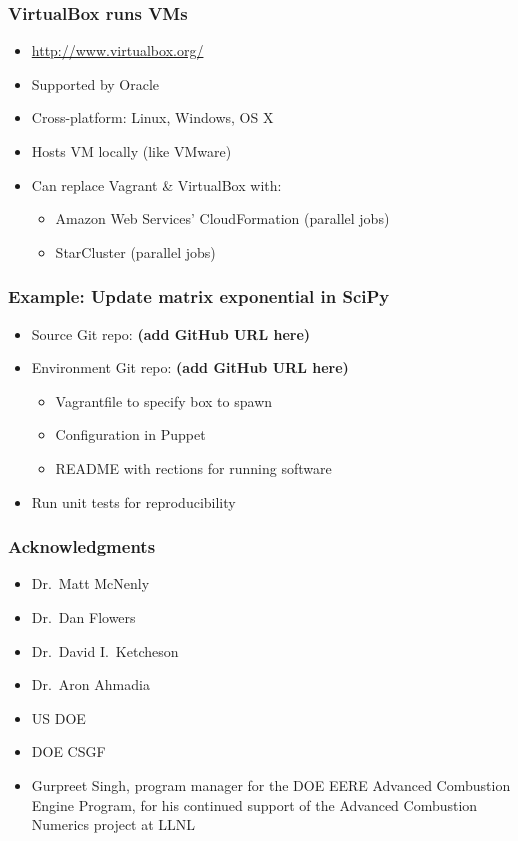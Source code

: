 \documentclass [14pt]{beamer}
\begin{document}
\begin{frame}
\frametitle{VirtualBox runs VMs}
\begin{itemize}
\item \url{http://www.virtualbox.org/}
\item Supported by Oracle
\item Cross-platform: Linux, Windows, OS X
\item Hosts VM locally (like VMware)
\item Can replace Vagrant \& VirtualBox with:
\begin{itemize}
\item Amazon Web Services' CloudFormation (parallel jobs)
\item StarCluster (parallel jobs)
\end{itemize}
\end{itemize}
\end{frame}

\begin{frame}
\frametitle{Example: Update matrix exponential in SciPy}
\begin{itemize}
\item Source Git repo: \textbf{(add GitHub URL here)}
\item Environment Git repo: \textbf{(add GitHub URL here)}
\begin{itemize}
\item Vagrantfile to specify box to spawn
\item Configuration in Puppet
\item README with rections for running software
\end{itemize}
\item Run unit tests for reproducibility
\end{itemize}
\end{frame}

\begin{frame}
\frametitle{Acknowledgments}
\begin{itemize}
\item Dr.\ Matt McNenly
\item Dr.\ Dan Flowers
\item Dr.\ David I.\ Ketcheson
\item Dr.\ Aron Ahmadia
\item US DOE
\item DOE CSGF
\item Gurpreet Singh, program manager for the DOE EERE Advanced
  Combustion Engine Program, for his continued support of the Advanced
  Combustion Numerics project at LLNL
\end{itemize}
\end{frame}

\begin{frame}
\end{frame}
\end{document}
